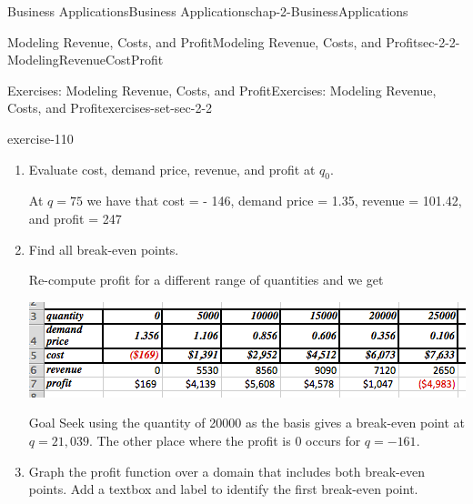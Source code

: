 \documentclass[oneside,10pt,]{book}
\numberwithin{equation}{section}
\newcommand{\amp}{&}
\begin{document}
\begin{chapterptx}{Business Applications}{}{Business Applications}{}{}{chap-2-BusinessApplications}
\begin{sectionptx}{Modeling Revenue, Costs, and Profit}{}{Modeling Revenue, Costs, and Profit}{}{}{sec-2-2-ModelingRevenueCostProfit}
\begin{exercises-subsection-numberless}{Exercises: Modeling Revenue, Costs, and Profit}{}{Exercises: Modeling Revenue, Costs, and Profit}{}{}{exercises-set-sec-2-2}
\begin{exercisegroup}
\begin{divisionexerciseeg}{7}{}{}{exercise-110}
\begin{enumerate}[label=(\alph*)]
\begin{equation*}
Revenue= 5*(10)^{-5}  x^2+1.356x 
\end{equation*}
%
\begin{align*}
profit\amp= 5*(10)^{-5}  x^2+1.356x- 0.3121 x+169.35\\
\amp= 5*(10)^{-5}  x^2+1.0439x+169.35 
\end{align*}
\item\hypertarget{li-213}{}\hypertarget{p-735}{}%
Evaluate cost, demand price, revenue, and profit at \(q_0\).%
\par
\hypertarget{p-736}{}%
At \(q = 75\) we have that cost = - \textdollar{}146, demand price = \textdollar{}1.35, revenue = \textdollar{}101.42, and profit = \textdollar{}247%
\item\hypertarget{li-214}{}\hypertarget{p-737}{}%
Find all break-even points.%
\par
\hypertarget{p-738}{}%
Re-compute profit for a different range of quantities and we get%
\begin{sidebyside}{1}{0}{0}{0}%
\begin{sbspanel}{1}%
\includegraphics[width=1\linewidth]{images/sec2-2-sol7b.png}
\end{sbspanel}%
\end{sidebyside}%
\par
\hypertarget{p-739}{}%
Goal Seek using the quantity of 20000 as the basis gives a break-even point at \(q= 21,039\). The other place where the profit is 0 occurs for \(q = -161\).%
\item\hypertarget{li-215}{}\hypertarget{p-740}{}%
Graph the profit function over a domain that includes both break-even points.  Add a textbox and label to identify the first break-even point.%
\begin{sidebyside}{1}{0}{0}{0}%
\begin{sbspanel}{1}%

\end{sbspanel}
\end{sidebyside}
\end{enumerate}
\end{divisionexerciseeg}
\end{exercisegroup}
\end{exercises-subsection-numberless}
\end{sectionptx}
\end{chapterptx}
\end{document}
